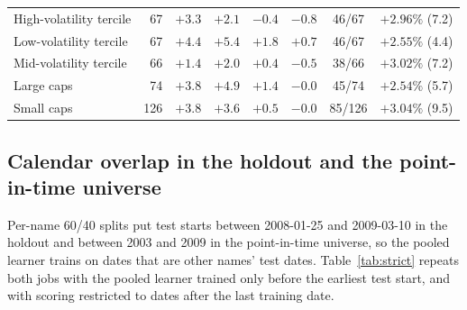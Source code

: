 \begin{table}[htbp]
\begin{threeparttable}
\begin{tabular}{lrcccccc}
\midrule
High-volatility tercile & 67 & $+3.3$ & $+2.1$ & $-0.4$ & $-0.8$ & 46/67 & $+2.96\%$ (7.2) \\
Low-volatility tercile & 67 & $+4.4$ & $+5.4$ & $+1.8$ & $+0.7$ & 46/67 & $+2.55\%$ (4.4) \\
Mid-volatility tercile & 66 & $+1.4$ & $+2.0$ & $+0.4$ & $-0.5$ & 38/66 & $+3.02\%$ (7.2) \\
\midrule
Large caps & 74 & $+3.8$ & $+4.9$ & $+1.4$ & $-0.0$ & 45/74 & $+2.54\%$ (5.7) \\
Small caps & 126 & $+3.8$ & $+3.6$ & $+0.5$ & $-0.0$ & 85/126 & $+3.04\%$ (9.5) \\
\bottomrule\end{tabular}\end{threeparttable}\end{table}

\subsection*{Calendar overlap in the holdout and the point-in-time universe}
Per-name 60/40 splits put test starts between 2008-01-25 and 2009-03-10 in the holdout and between 2003 and 2009 in the point-in-time universe, so the pooled learner trains on dates that are other names' test dates. Table~\ref{tab:strict} repeats both jobs with the pooled learner trained only before the earliest test start, and with scoring restricted to dates after the last training date.

